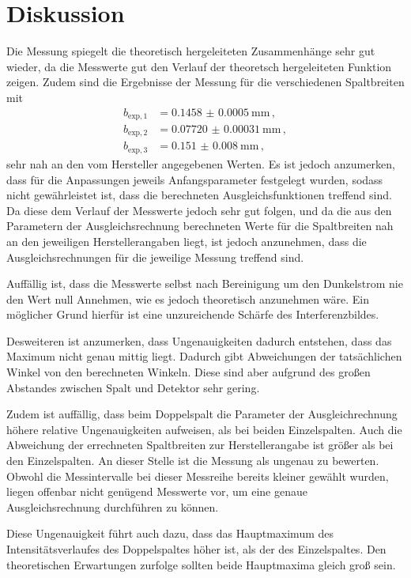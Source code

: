 \section{Diskussion}
\label{sec:Diskussion}
Die Messung spiegelt die theoretisch hergeleiteten Zusammenhänge sehr gut wieder,
da die Messwerte gut den Verlauf der theoretsch hergeleiteten Funktion zeigen. Zudem
sind die Ergebnisse der Messung für die verschiedenen Spaltbreiten mit
\begin{align*}
  b_{\text{exp},1}&=\SI{0.1458(00005)}{\milli\meter} \,, \\
  b_{\text{exp},2}&=\SI{0.07720(000031)}{\milli\meter} \,,\\
  b_{\text{exp},3}&=\SI{0.151(0008)}{\milli\meter} \,,
\end{align*}
sehr nah an den vom Hersteller angegebenen Werten.
Es ist jedoch anzumerken, dass für die Anpassungen jeweils Anfangsparameter festgelegt
wurden, sodass nicht gewährleistet ist, dass die berechneten Ausgleichsfunktionen
treffend sind. Da diese dem Verlauf der Messwerte jedoch sehr gut folgen, und da
die aus den Parametern der Ausgleichsrechnung berechneten Werte für die Spaltbreiten
nah an den jeweiligen Herstellerangaben liegt, ist jedoch
anzunehmen, dass die Ausgleichsrechnungen für die jeweilige Messung treffend sind.

Auffällig ist, dass die Messwerte selbst nach Bereinigung um den Dunkelstrom nie
den Wert null Annehmen, wie es jedoch  theoretisch anzunehmen wäre. Ein möglicher Grund
hierfür ist eine unzureichende Schärfe des Interferenzbildes.

Desweiteren ist anzumerken, dass Ungenauigkeiten dadurch entstehen, dass das Maximum
nicht genau mittig liegt. Dadurch gibt Abweichungen der tatsächlichen Winkel
von den berechneten Winkeln. Diese sind aber aufgrund des großen Abstandes zwischen
Spalt und Detektor sehr gering.

Zudem ist auffällig, dass beim Doppelspalt die Parameter der Ausgleichrechnung höhere
relative Ungenauigkeiten aufweisen, als bei beiden Einzelspalten. Auch die Abweichung
der errechneten Spaltbreiten zur Herstellerangabe ist größer als bei den Einzelspalten.
An dieser Stelle ist die Messung als ungenau zu bewerten. Obwohl die Messintervalle
bei dieser Messreihe bereits kleiner gewählt wurden, liegen offenbar nicht genügend Messwerte
vor, um eine genaue Ausgleichsrechnung durchführen zu können.

Diese Ungenauigkeit führt auch dazu, dass das Hauptmaximum des Intensitätsverlaufes des
Doppelspaltes höher ist, als der des Einzelspaltes. Den theoretischen Erwartungen zurfolge
sollten beide Hauptmaxima gleich groß sein.



